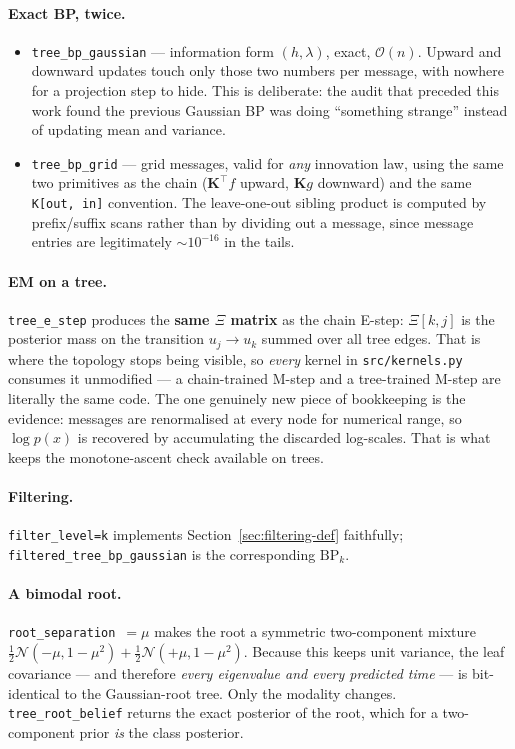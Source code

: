\documentclass[11pt]{article}
\theoremstyle{remark}
\newcommand{\Xis}{\Xi}
\newcommand{\code}[1]{\texttt{\small #1}}
\begin{document}
\paragraph{Exact BP, twice.}
\begin{itemize}[nosep]
  \item \code{tree\_bp\_gaussian} --- information form $(h,\lambda)$, exact,
    $\mathcal O(n)$. Upward and downward updates touch only those two numbers
    per message, with nowhere for a projection step to hide. This is deliberate:
    the audit that preceded this work found the previous Gaussian BP was doing
    ``something strange'' instead of updating mean and variance.
  \item \code{tree\_bp\_grid} --- grid messages, valid for \emph{any} innovation
    law, using the same two primitives as the chain ($\bm K^\top f$ upward,
    $\bm K g$ downward) and the same \code{K[out, in]} convention. The
    leave-one-out sibling product is computed by prefix/suffix scans rather than
    by dividing out a message, since message entries are legitimately
    $\sim 10^{-16}$ in the tails.
\end{itemize}

\paragraph{EM on a tree.} \code{tree\_e\_step} produces the \textbf{same
$\Xis$ matrix} as the chain E-step: $\Xis[k,j]$ is the posterior mass on the
transition $u_j \to u_k$ summed over all tree edges. That is where the topology
stops being visible, so \emph{every} kernel in \code{src/kernels.py} consumes it
unmodified --- a chain-trained M-step and a tree-trained M-step are literally the
same code. The one genuinely new piece of bookkeeping is the evidence: messages
are renormalised at every node for numerical range, so $\log p(x)$ is recovered
by accumulating the discarded log-scales. That is what keeps the
monotone-ascent check available on trees.

\paragraph{Filtering.} \code{filter\_level=k} implements
Section~\ref{sec:filtering-def} faithfully; \code{filtered\_tree\_bp\_gaussian}
is the corresponding $\mathrm{BP}_k$.

\paragraph{A bimodal root.} \code{root\_separation}~$=\mu$ makes the root a
symmetric two-component mixture $\tfrac12\mathcal N(-\mu,1-\mu^2) +
\tfrac12\mathcal N(+\mu,1-\mu^2)$. Because this keeps unit variance, the leaf
covariance --- and therefore \emph{every eigenvalue and every predicted time} ---
is bit-identical to the Gaussian-root tree. Only the modality changes.
\code{tree\_root\_belief} returns the exact posterior of the root, which for a
two-component prior \emph{is} the class posterior.
\end{document}
